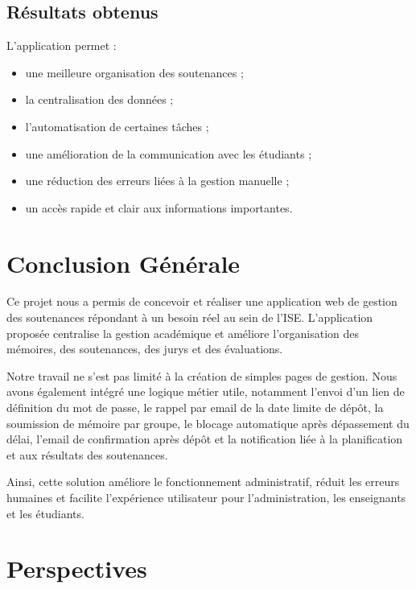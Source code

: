 \documentclass[a4paper,12pt,oneside]{report}
\begin{document}
\section{Résultats obtenus}

L'application permet :
\begin{itemize}
    \item une meilleure organisation des soutenances ;
    \item la centralisation des données ;
    \item l'automatisation de certaines tâches ;
    \item une amélioration de la communication avec les étudiants ;
    \item une réduction des erreurs liées à la gestion manuelle ;
    \item un accès rapide et clair aux informations importantes.
\end{itemize}

\chapter*{Conclusion Générale}

Ce projet nous a permis de concevoir et réaliser une application web de gestion des soutenances répondant à un besoin réel au sein de l'ISE. L'application proposée centralise la gestion académique et améliore l'organisation des mémoires, des soutenances, des jurys et des évaluations.

Notre travail ne s'est pas limité à la création de simples pages de gestion. Nous avons également intégré une logique métier utile, notamment l'envoi d'un lien de définition du mot de passe, le rappel par email de la date limite de dépôt, la soumission de mémoire par groupe, le blocage automatique après dépassement du délai, l'email de confirmation après dépôt et la notification liée à la planification et aux résultats des soutenances.

Ainsi, cette solution améliore le fonctionnement administratif, réduit les erreurs humaines et facilite l'expérience utilisateur pour l'administration, les enseignants et les étudiants.

\chapter*{Perspectives}
\end{document}
